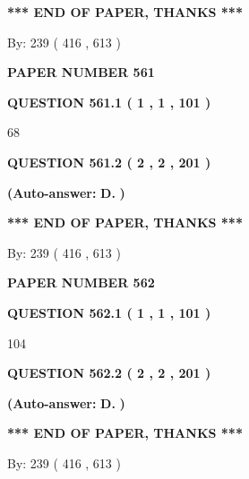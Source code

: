 \documentclass{ctexart}
\begin{document}
 
   
   
   
   
\vspace{1.0in} 
{\textbf{\large{ *** END OF PAPER, THANKS *** }}} 
   
   
\hspace{1.0in} By: 
 239 ( 416 ,  613 )
   
   
   
   
\newpage 
\setcounter{page}{ 
   561001 } 
   
   
 {\textbf{ \Large{ PAPER NUMBER  561  }}}
   
   
   
   
  
  
{\textbf{\large{QUESTION
561.1 
 ( 1 , 1 , 101 )
}}}

68
  
  
{\textbf{\large{QUESTION
561.2 
 ( 2 , 2 , 201 )
}}}
 
 
{\textbf{(Auto-answer:}}
{\textbf{\large{
D.}}}
{\textbf{)}}
 
 
   
   
   
   
\vspace{1.0in} 
{\textbf{\large{ *** END OF PAPER, THANKS *** }}} 
   
   
\hspace{1.0in} By: 
 239 ( 416 ,  613 )
   
   
   
   
\newpage 
\setcounter{page}{ 
   562001 } 
   
   
 {\textbf{ \Large{ PAPER NUMBER  562  }}}
   
   
   
   
  
  
{\textbf{\large{QUESTION
562.1 
 ( 1 , 1 , 101 )
}}}

104
  
  
{\textbf{\large{QUESTION
562.2 
 ( 2 , 2 , 201 )
}}}
 
 
{\textbf{(Auto-answer:}}
{\textbf{\large{
D.}}}
{\textbf{)}}
 
 
   
   
   
   
\vspace{1.0in} 
{\textbf{\large{ *** END OF PAPER, THANKS *** }}} 
   
   
\hspace{1.0in} By: 
 239 ( 416 ,  613 )
   
   
   
   
\newpage 
\setcounter{page}{ 
   563001 } 
   
\end{document}
